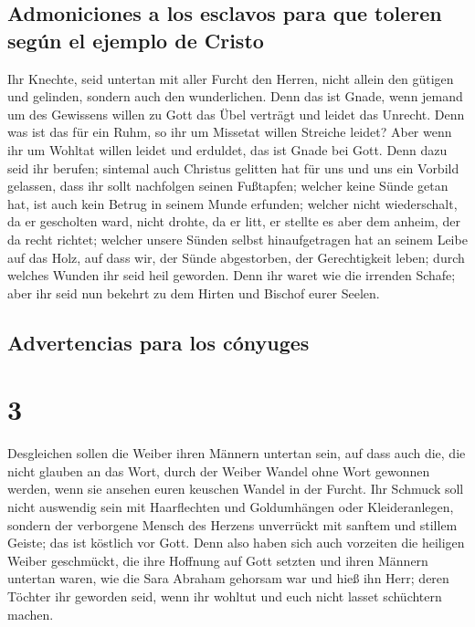\hypertarget{admoniciones-a-los-esclavos-para-que-toleren-seguxfan-el-ejemplo-de-cristo}{%
\subsection{Admoniciones a los esclavos para que toleren según el
ejemplo de
Cristo}\label{admoniciones-a-los-esclavos-para-que-toleren-seguxfan-el-ejemplo-de-cristo}}

 Ihr Knechte, seid untertan mit aller Furcht den Herren,
nicht allein den gütigen und gelinden, sondern auch den wunderlichen.
 Denn das ist Gnade, wenn jemand um des Gewissens willen
zu Gott das Übel verträgt und leidet das Unrecht.  Denn
was ist das für ein Ruhm, so ihr um Missetat willen Streiche leidet?
Aber wenn ihr um Wohltat willen leidet und erduldet, das ist Gnade bei
Gott.  Denn dazu seid ihr berufen; sintemal auch Christus
gelitten hat für uns und uns ein Vorbild gelassen, dass ihr sollt
nachfolgen seinen Fußtapfen;  welcher keine Sünde getan
hat, ist auch kein Betrug in seinem Munde erfunden; 
welcher nicht wiederschalt, da er gescholten ward, nicht drohte, da er
litt, er stellte es aber dem anheim, der da recht richtet;
 welcher unsere Sünden selbst hinaufgetragen hat an
seinem Leibe auf das Holz, auf dass wir, der Sünde abgestorben, der
Gerechtigkeit leben; durch welches Wunden ihr seid heil geworden.
 Denn ihr waret wie die irrenden Schafe; aber ihr seid
nun bekehrt zu dem Hirten und Bischof eurer Seelen.

\hypertarget{advertencias-para-los-cuxf3nyuges}{%
\subsection{Advertencias para los
cónyuges}\label{advertencias-para-los-cuxf3nyuges}}

\hypertarget{section-2}{%
\section{3}\label{section-2}}

 Desgleichen sollen die Weiber ihren Männern untertan
sein, auf dass auch die, die nicht glauben an das Wort, durch der Weiber
Wandel ohne Wort gewonnen werden,  wenn sie ansehen euren
keuschen Wandel in der Furcht.  Ihr Schmuck soll nicht
auswendig sein mit Haarflechten und Goldumhängen oder Kleideranlegen,
 sondern der verborgene Mensch des Herzens unverrückt mit
sanftem und stillem Geiste; das ist köstlich vor Gott. 
Denn also haben sich auch vorzeiten die heiligen Weiber geschmückt, die
ihre Hoffnung auf Gott setzten und ihren Männern untertan waren,
 wie die Sara Abraham gehorsam war und hieß ihn Herr;
deren Töchter ihr geworden seid, wenn ihr wohltut und euch nicht lasset
schüchtern machen.

